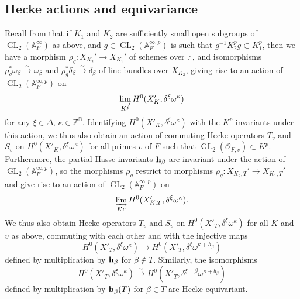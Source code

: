 \documentclass[11pt,pdflatex]{amsart}
\theoremstyle{plain}
\theoremstyle{definition}
\newcommand{\FF}{\mathbf{F}}
\newcommand{\ZZ}{\mathbf{Z}}
\newcommand{\CO}{\mathcal{O}}
\theoremstyle{plain}
\theoremstyle{definition}
\theoremstyle{remark}
\numberwithin{equation}{section}
\numberwithin{figure}{section} \numberwithin{table}{subsection}
\newcommand{\GL}{{\operatorname{GL}}}
\def\AA{\mathbb{A}}
\def\BB{\mathbb{B}}
\def\FF{\mathbb{F}}
\def\ZZ{\mathbb{Z}}
\begin{document}
\subsection{Hecke actions and equivariance}
Recall from \cite[\S\S2.1.3, 3.1.1]{DKS} that if $K_1$ and $K_2$ are sufficiently small open subgroups of $\GL_2(\AA_{F}^\infty)$ as above, and $g \in \GL_2(\AA_{F}^{\infty,p})$ is such that $g^{-1}K^p_2g \subset K^p_1$, then we have a morphism $\rho_g:X_{K_2}' \to X_{K_1}'$ of schemes over $\FF$, and isomorphisms $\rho_g^*\omega_\beta \stackrel{\sim}{\to} \omega_\beta$ and $\rho_g^*\delta_\beta \stackrel{\sim}{\to} \delta_\beta$ of line bundles over $X_{K_2}$, giving rise to an action of $\GL_2(\AA_{F}^{\infty,p})$ on
$$\varinjlim_{K^p} H^0(X'_K, \delta^\xi\omega^\kappa)$$
for any $\xi \in \Delta$, $\kappa \in \ZZ^{\BB}$.  Identifying $H^0(X'_K,\delta^\xi\omega^\kappa)$ with the $K^p$ invariants under this action, we thus also obtain an action of commuting Hecke operators $T_v$ and $S_v$ on $H^0(X'_K, \delta^\xi\omega^\kappa)$ for all primes $v$ of $F$ such that $\GL_2(\CO_{F,v})\subset K^p$.  Furthermore, the partial Hasse invariants ${\bf h}_\beta$ are invariant under the action of $\GL_2(\AA_F^{\infty,p})$, so the morphisms $\rho_g$ restrict to morphisms $\rho_g:X_{K_2,T}' \to X_{K_1,T}'$ and give rise to an action of $\GL_2(\AA_{F}^{\infty,p})$ on
$$\varinjlim_{K^p} H^0(X'_{K,T}, \delta^\xi\omega^\kappa).$$
We thus also obtain Hecke operators $T_v$ and $S_v$ on $H^0(X'_{T}, \delta^\xi\omega^\kappa)$ for all $K$ and $v$ as above, commuting with each other and with the injective maps
$$H^0(X'_T, \delta^\xi\omega^\kappa) \longrightarrow
 H^0(X'_T, \delta^\xi\omega^{\kappa+h_\beta})$$
defined by multiplication by ${\bf h}_\beta$ for $\beta \not\in T$.  Similarly, the isomorphisms
$$H^0(X'_T, \delta^\xi\omega^\kappa) \stackrel{\sim}{\longrightarrow}
 H^0(X'_T, \delta^{\xi-\overline{\beta}}\omega^{\kappa+b_\beta})$$
defined by multiplication by ${\bf b}_\beta(T)$ for $\beta \in T$ are Hecke-equivariant.
\end{document}
